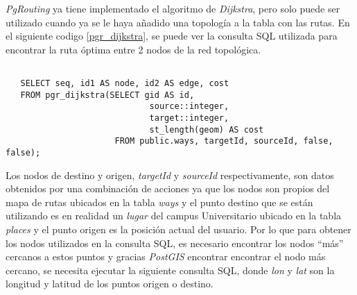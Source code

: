 
\emph{PgRouting} ya tiene implementado el algoritmo de \emph{Dijkstra}, pero solo puede ser utilizado cuando ya se le haya añadido una topología a la tabla con las rutas. En el siguiente codigo \ref{pgr_dijkstra}, se puede ver la consulta SQL utilizada para encontrar la ruta óptima entre 2 nodos de la red topológica.\\

\begin{center}
 \begin{lstlisting}[label=pgr_dijkstra,caption=Algoritmo de Dijkstra implementado en \emph{pRouting}]

   SELECT seq, id1 AS node, id2 AS edge, cost
   FROM pgr_dijkstra(SELECT gid AS id,
                             source::integer,
                             target::integer,
                             st_length(geom) AS cost
                      FROM public.ways, targetId, sourceId, false, false);

 \end{lstlisting}
\end{center}



Los nodos de destino y origen, \emph{targetId} y \emph{sourceId} respectivamente, son datos obtenidos por una combinación de acciones ya que los nodos son propios del mapa de rutas ubicados en la tabla \emph{ways} y el punto destino que se están utilizando es en realidad un \emph{lugar} del campus Universitario ubicado en la tabla \emph{places} y el punto origen es la posición actual del usuario. Por lo que para obtener los nodos utilizados en la consulta SQL, es necesario encontrar los nodos ``más'' cercanos a estos puntos y gracias \emph{PostGIS} encontrar encontrar el nodo más cercano, se necesita ejecutar la siguiente consulta SQL, donde \emph{lon} y \emph{lat} son la longitud y latitud de los puntos origen o destino. \\

